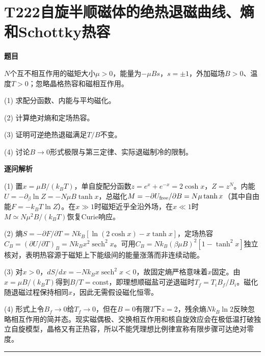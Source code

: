 \documentclass[UTF8,a4paper,11pt,oneside,openany]{ctexbook}
\begin{document}
\section*{T222\quad 自旋半顺磁体的绝热退磁曲线、熵和Schottky热容}
\textbf{题目}\par
$N$个互不相互作用的磁矩大小$\mu>0$，能量为$-\mu Bs$，$s=\pm1$，外加磁场$B>0$、温度$T>0$；忽略晶格热容和磁相互作用。
\par\smallskip\noindent (1) 求配分函数、内能与平均磁化。
\par\smallskip\noindent (2) 计算绝对熵和定场热容。
\par\smallskip\noindent (3) 证明可逆绝热退磁满足$T/B$不变。
\par\smallskip\noindent (4) 讨论$B\to0$形式极限与第三定律、实际退磁制冷的限制。
\par\medskip\textbf{逐问解析}\par
\par\smallskip\noindent (1) 置$x=\mu B/(k_BT)$，单自旋配分函数$z=e^x+e^{-x}=2\cosh x$，$Z=z^N$。内能$U=-\partial_\beta\ln Z=-N\mu B\tanh x$，总磁化$M=-\partial U_{\rm free}/\partial B=N\mu\tanh x$（其中自由能$F=-k_BT\ln Z$）。在$x\gg1$时磁矩近乎全沿外场，在$x\ll1$时$M\simeq N\mu^2B/(k_BT)$恢复Curie响应。
\par\smallskip\noindent (2) 熵$S=-\partial F/\partial T=Nk_B[\ln(2\cosh x)-x\tanh x]$，定场热容$C_B=(\partial U/\partial T)_B=Nk_Bx^2\operatorname{sech}^2x$。可用$C_B=Nk_B(\beta\mu B)^2[1-\tanh^2x]$独立核对，表明热容源于磁矩上下能级间的能量涨落而非连续动能。
\par\smallskip\noindent (3) 对$x>0$，$dS/dx=-Nk_Bx\operatorname{sech}^2x<0$，故固定熵严格意味着$x$固定。由$x=\mu B/(k_BT)$得到$B/T=\mathrm{const}$，即理想顺磁盐可逆退磁时$T_f=T_iB_f/B_i$。磁化随退磁过程保持相同$x$，因此无需假设磁化恒零。
\par\smallskip\noindent (4) 形式上令$B_f\to0$给$T_f\to0$，但在$B=0$有限$T$下$z=2$，残余熵$Nk_B\ln2$反映忽略相互作用的简并态。现实磁偶极、交换相互作用和核自旋效应会在极低温打破独立自旋模型，晶格又有正热容，所以不能凭理想比例律宣称有限步骤可达绝对零度。
\par\medskip\hrule\medskip
\end{document}
